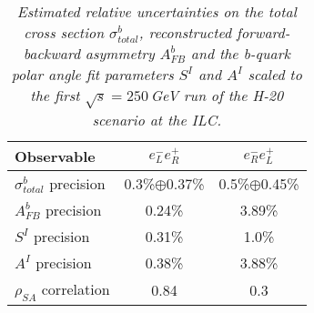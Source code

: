         \begin{table}
        \begin{center}
        \begin{tabular}{l c c}
        \hline
	Observable &  $e^-_Le^+_R$ &  $e^-_Re^+_L$\\
	\hline
	$\sigma^b_{total}$ precision  & 0.3\%$\oplus$0.37\%   & 0.5\%$\oplus$0.45\% \\
	$A_{FB}^{b}$ precision	  & 0.24\%  			  & 3.89\% \\
	\hline
	$S^I $ 	precision			  & 0.31\% 				  & 1.0\% \\
	$A^I $ 	precision			  & 0.38\% 				  & 3.88\% \\
	$\rho_{SA}$ correlation		  & 0.84				  & 0.3 \\
        \hline
        \end{tabular}
        \end{center}
        \caption{\sl Estimated relative uncertainties on the total cross section $\sigma^b_{total}$, reconstructed forward-backward asymmetry $A_{FB}^{b}$ and the b-quark polar angle fit parameters $S^I$ and $A^I$ scaled to the first $\sqrt{s}=250$\,GeV run of the H-20 scenario at the ILC. }
        \label{table:bbbarfinal}
        \end{table}
